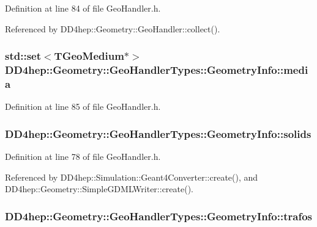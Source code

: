 Definition at line 84 of file GeoHandler.h.

Referenced by DD4hep::Geometry::GeoHandler::collect().\hypertarget{class_d_d4hep_1_1_geometry_1_1_geo_handler_types_1_1_geometry_info_a39bb8b651e878cdfeac6d0ef028734d8}{
\subsubsection[{media}]{\setlength{\rightskip}{0pt plus 5cm}std::set$<$TGeoMedium$\ast$$>$ {\bf DD4hep::Geometry::GeoHandlerTypes::GeometryInfo::media}}}
\label{class_d_d4hep_1_1_geometry_1_1_geo_handler_types_1_1_geometry_info_a39bb8b651e878cdfeac6d0ef028734d8}


Definition at line 85 of file GeoHandler.h.\hypertarget{class_d_d4hep_1_1_geometry_1_1_geo_handler_types_1_1_geometry_info_a121f17ff08f77f9eda63a704648f8994}{
\subsubsection[{solids}]{ {\bf DD4hep::Geometry::GeoHandlerTypes::GeometryInfo::solids}}}
\label{class_d_d4hep_1_1_geometry_1_1_geo_handler_types_1_1_geometry_info_a121f17ff08f77f9eda63a704648f8994}


Definition at line 78 of file GeoHandler.h.

Referenced by DD4hep::Simulation::Geant4Converter::create(), and DD4hep::Geometry::SimpleGDMLWriter::create().\hypertarget{class_d_d4hep_1_1_geometry_1_1_geo_handler_types_1_1_geometry_info_a51f3a3d4173ce95231772c575b18cd8d}{
\subsubsection[{trafos}]{ {\bf DD4hep::Geometry::GeoHandlerTypes::GeometryInfo::trafos}}}
\label{class_d_d4hep_1_1_geometry_1_1_geo_handler_types_1_1_geometry_info_a51f3a3d4173ce95231772c575b18cd8d}


